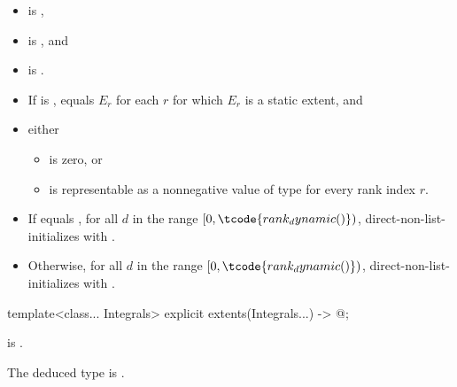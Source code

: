 \begin{itemdescr}
\pnum
\constraints
\begin{itemize}
\item
{} is ,
\item
{} is , and
\item
{} is .
\end{itemize}

\pnum
\expects
\begin{itemize}
\item
If  is ,
 equals $E_r$ for each $r$ for which $E_r$ is a static extent, and
\item
either
\begin{itemize}
\item
{} is zero, or
\item
{} is representable
as a nonnegative value of type  for every rank index $r$.
\end{itemize}
\end{itemize}

\pnum
\effects
\begin{itemize}
\item
If  equals ,
for all $d$ in the range $[0, \tcode{rank_dynamic()})$,
direct-non-list-initializes 
with .
\item
Otherwise, for all $d$ in the range $[0, \tcode{rank_dynamic()})$,
direct-non-list-initializes \tcode{[$d$]}
with .
\end{itemize}
\end{itemdescr}

%
\begin{itemdecl}
template<class... Integrals>
  explicit extents(Integrals...) -> @\seebelow@;
\end{itemdecl}

\begin{itemdescr}
\pnum
\constraints
{} is .

\pnum
\remarks
The deduced type is .
\end{itemdescr}

